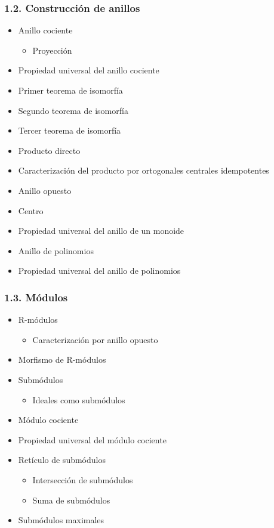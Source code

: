 \documentclass[11pt]{article}
\begin{document}
\subsubsection*{1.2. Construcción de anillos}
\label{sec-7-1-2}
\begin{itemize}
\item Anillo cociente
\label{sec-7-1-2-1}
\begin{itemize}
\item Proyección
\label{sec-7-1-2-1-1}
\end{itemize}
\item Propiedad universal del anillo cociente
\label{sec-7-1-2-2}
\item Primer teorema de isomorfía
\label{sec-7-1-2-3}
\item Segundo teorema de isomorfía
\label{sec-7-1-2-4}
\item Tercer teorema de isomorfía
\label{sec-7-1-2-5}
\item Producto directo
\label{sec-7-1-2-6}
\item Caracterización del producto por ortogonales centrales idempotentes
\label{sec-7-1-2-7}
\item Anillo opuesto
\label{sec-7-1-2-8}
\item Centro
\label{sec-7-1-2-9}
\item Propiedad universal del anillo de un monoide
\label{sec-7-1-2-10}
\item Anillo de polinomios
\label{sec-7-1-2-11}
\item Propiedad universal del anillo de polinomios
\label{sec-7-1-2-12}
\end{itemize}
\subsubsection*{1.3. Módulos}
\label{sec-7-1-3}
\begin{itemize}
\item R-módulos
\label{sec-7-1-3-1}
\begin{itemize}
\item Caracterización por anillo opuesto
\label{sec-7-1-3-1-1}
\end{itemize}
\item Morfismo de R-módulos
\label{sec-7-1-3-2}
\item Submódulos
\label{sec-7-1-3-3}
\begin{itemize}
\item Ideales como submódulos
\label{sec-7-1-3-3-1}
\end{itemize}
\item Módulo cociente
\label{sec-7-1-3-4}
\item Propiedad universal del módulo cociente
\label{sec-7-1-3-5}
\item Retículo de submódulos
\label{sec-7-1-3-6}
\begin{itemize}
\item Intersección de submódulos
\label{sec-7-1-3-6-1}
\item Suma de submódulos
\label{sec-7-1-3-6-2}
\end{itemize}
\item Submódulos maximales
\label{sec-7-1-3-7}
\end{itemize}
\end{document}
